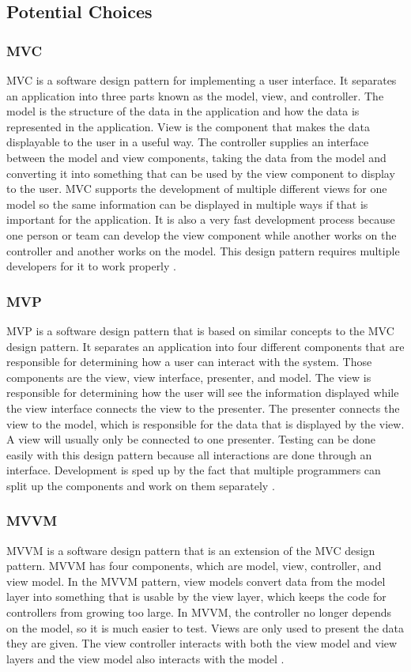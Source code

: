 \documentclass[onecolumn, draftclsnofoot,10pt, compsoc]{IEEEtran}
\begin{document}
\subsection{Potential Choices}

\subsubsection{MVC}
MVC is a software design pattern for implementing a user interface. It separates an application into three parts known as the model, view, and controller. The model is the structure of the data in the application and how the data is represented in the application. View is the component that makes the data displayable to the user in a useful way. The controller supplies an interface between the model and view components, taking the data from the model and converting it into something that can be used by the view component to display to the user. MVC supports the development of multiple different views for one model so the same information can be displayed in multiple ways if that is important for the application. It is also a very fast development process because one person or team can develop the view component while another works on the controller and another works on the model. This design pattern requires multiple developers for it to work properly \cite{mvc}.

\subsubsection{MVP}
MVP is a software design pattern that is based on similar concepts to the MVC design pattern. It separates an application into four different components that are responsible for determining how a user can interact with the system. Those components are the view, view interface, presenter, and model. The view is responsible for determining how the user will see the information displayed while the view interface connects the view to the presenter. The presenter connects the view to the model, which is responsible for the data that is displayed by the view. A view will usually only be connected to one presenter. Testing can be done easily with this design pattern because all interactions are done through an interface. Development is sped up by the fact that multiple programmers can split up the components and work on them separately \cite{mvp}.

\subsubsection{MVVM}
MVVM is a software design pattern that is an extension of the MVC design pattern. MVVM has four components, which are model, view, controller, and view model. In the MVVM pattern, view models convert data from the model layer into something that is usable by the view layer, which keeps the code for controllers from growing too large. In MVVM, the controller no longer depends on the model, so it is much easier to test. Views are only used to present the data they are given. The view controller interacts with both the view model and view layers and the view model also interacts with the model \cite{mvvm}.
\end{document}
